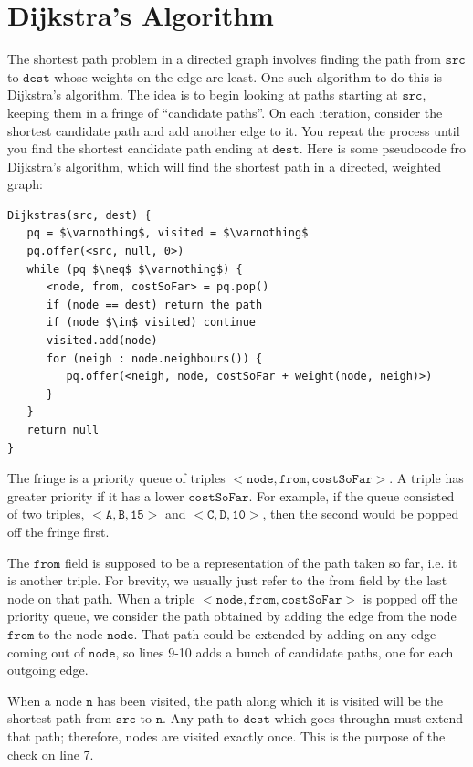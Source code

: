 \documentclass[a4paper,12pt]{article}
\newcommand{\kwa}[1]{\mathtt{#1}}
\begin{document}
\section{Dijkstra's Algorithm}

\noindent
The shortest path problem in a directed graph involves finding the path from $\kwa{src}$ to $\kwa{dest}$ whose weights on the edge are least. One such algorithm to do this is Dijkstra's algorithm. The idea is to begin looking at paths starting at $\kwa{src}$, keeping them in a fringe of ``candidate paths''. On each iteration, consider the shortest candidate path and add another edge to it. You repeat the process until you find the shortest candidate path ending at $\kwa{dest}$. Here is some pseudocode fro Dijkstra's algorithm, which will find the shortest path in a directed, weighted graph:

\begin{lstlisting}
Dijkstras(src, dest) {
   pq = $\varnothing$, visited = $\varnothing$
   pq.offer(<src, null, 0>)
   while (pq $\neq$ $\varnothing$) {
      <node, from, costSoFar> = pq.pop()
      if (node == dest) return the path
      if (node $\in$ visited) continue
      visited.add(node)
      for (neigh : node.neighbours()) {
         pq.offer(<neigh, node, costSoFar + weight(node, neigh)>)
      }
   }
   return null
}
\end{lstlisting}

\noindent
The fringe is a priority queue of triples $\kwa{<node, from, costSoFar>}$. A triple has greater priority if it has a lower $\kwa{costSoFar}$. For example, if the queue consisted of two triples, $\kwa{<A, B, 15>}$ and $\kwa{<C, D, 10>}$, then the second would be popped off the fringe first. 

The $\kwa{from}$ field is supposed to be a representation of the path taken so far, i.e. it is another triple. For brevity, we usually just refer to the from field by the last node on that path. When a triple $\kwa{<node, from, costSoFar>}$ is popped off the priority queue, we consider the path obtained by adding the edge from the node $\kwa{from}$ to the node $\kwa{node}$. That path could be extended by adding on any edge coming out of $\kwa{node}$, so lines 9-10 adds a bunch of candidate paths, one for each outgoing edge.

When a node $\kwa{n}$ has been visited, the path along which it is visited will be the shortest path from $\kwa{src}$ to $\kwa{n}$. Any path to $\kwa{dest}$ which goes through$ \kwa{n}$ must extend that path; therefore, nodes are visited exactly once. This is the purpose of the check on line 7.
\end{document}
